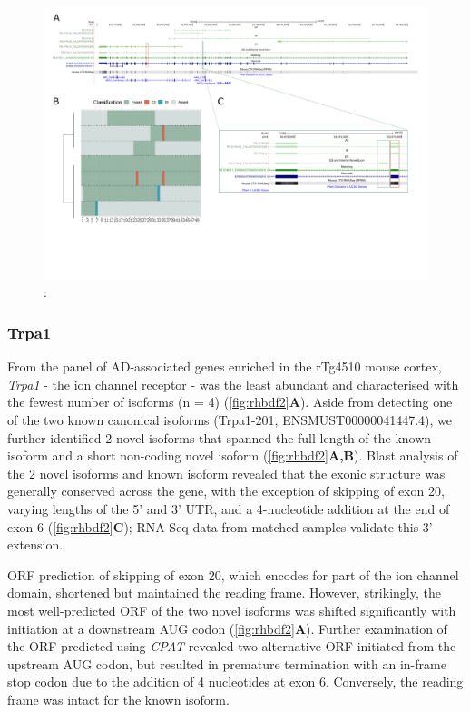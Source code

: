 \begin{landscape}
	\begin{figure}[htp]
		\begin{center}
			\includegraphics[page=1,trim={0 1cm 0 0},scale = 0.85]{Figures/TargetGenes_Annotation_Landscape.pdf}
		\end{center}
		\captionsetup{width=0.95\textwidth}
		\caption[RNA-Seq defined transcriptome]%
		{\textbf{}: }   
		\label{fig:abca1}
	\end{figure}
\end{landscape}

\newpage
\subsubsection{Trpa1}
From the panel of AD-associated genes enriched in the rTg4510 mouse cortex, \textit{Trpa1} - the ion channel receptor - was the least abundant and characterised with the fewest number of isoforms (n = 4) (\cref{fig:rhbdf2}\textbf{A}). Aside from detecting one of the two known canonical isoforms (Trpa1-201, ENSMUST00000041447.4), we further identified 2 novel isoforms that spanned the full-length of the known isoform and a short non-coding novel isoform (\cref{fig:rhbdf2}\textbf{A,B}). Blast analysis of the 2 novel isoforms and known isoform revealed that the exonic structure was generally conserved across the gene, with the exception of skipping of exon 20, varying lengths of the 5' and 3' UTR, and a 4-nucleotide addition at the end of exon 6 (\cref{fig:rhbdf2}\textbf{C}); RNA-Seq data from matched samples validate this 3' extension. 

ORF prediction of skipping of exon 20, which encodes for part of the ion channel domain, shortened but maintained the reading frame. However, strikingly, the most well-predicted ORF of the two novel isoforms was shifted significantly with initiation at a downstream AUG codon (\cref{fig:rhbdf2}\textbf{A}). Further examination of the ORF predicted using \textit{CPAT} revealed two alternative ORF initiated from the upstream AUG codon, but resulted in premature termination with an in-frame stop codon due to the addition of 4 nucleotides at exon 6. Conversely, the reading frame was intact for the known isoform.             

